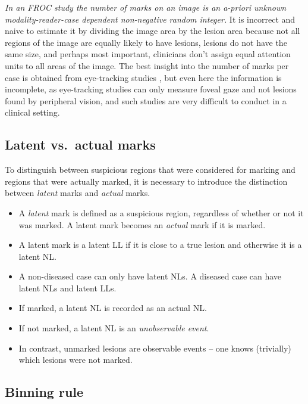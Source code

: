 \documentclass[
]{book}
\providecommand{\tightlist}{%
  \setlength{\itemsep}{0pt}\setlength{\parskip}{0pt}}
\begin{document}
\emph{In an FROC study the number of marks on an image is an a-priori unknown modality-reader-case dependent non-negative random integer.} It is incorrect and naive to estimate it by dividing the image area by the lesion area because not all regions of the image are equally likely to have lesions, lesions do not have the same size, and perhaps most important, clinicians don't assign equal attention units to all areas of the image. The best insight into the number of marks per case is obtained from eye-tracking studies \citep{RN1490}, but even here the information is incomplete, as eye-tracking studies can only measure foveal gaze and not lesions found by peripheral vision, and such studies are very difficult to conduct in a clinical setting.

\hypertarget{latent-vs.-actual-marks}{%
\subsection{Latent vs.~actual marks}\label{latent-vs.-actual-marks}}

To distinguish between suspicious regions that were considered for marking and regions that were actually marked, it is necessary to introduce the distinction between \emph{latent} marks and \emph{actual} marks.

\begin{itemize}
\tightlist
\item
  A \emph{latent} mark is defined as a suspicious region, regardless of whether or not it was marked. A latent mark becomes an \emph{actual} mark if it is marked.
\item
  A latent mark is a latent LL if it is close to a true lesion and otherwise it is a latent NL.
\item
  A non-diseased case can only have latent NLs. A diseased case can have latent NLs and latent LLs.
\item
  If marked, a latent NL is recorded as an actual NL.
\item
  If not marked, a latent NL is an \emph{unobservable event}.
\item
  In contrast, unmarked lesions are observable events -- one knows (trivially) which lesions were not marked.
\end{itemize}

\hypertarget{binning-rule}{%
\subsection{Binning rule}\label{binning-rule}}
\end{document}
